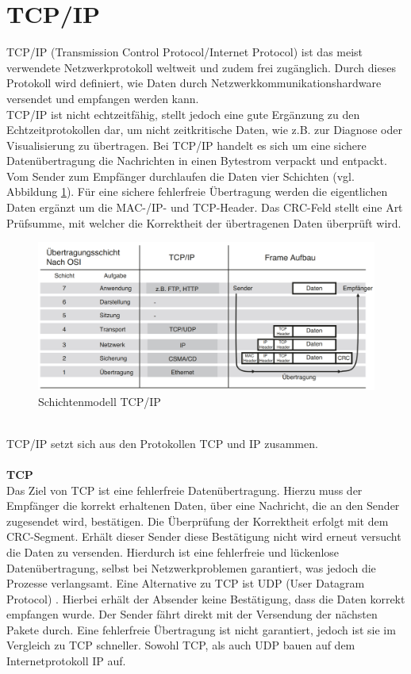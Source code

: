 \documentclass[ a4paper,
                oneside,
                toc=bibliography,
                toc=listof
                ]{scrbook}
\begin{document}
	\section{TCP/IP}
	TCP/IP (Transmission Control Protocol/Internet Protocol) ist das meist verwendete Netzwerkprotokoll weltweit und zudem frei zugänglich. Durch dieses Protokoll wird definiert, wie Daten durch Netzwerkkommunikationshardware versendet und empfangen werden kann. \cite{CS9_TCP} \\
	TCP/IP ist nicht echtzeitfähig, stellt jedoch eine gute Ergänzung zu den Echtzeitprotokollen dar, um nicht zeitkritische Daten, wie z.B. zur Diagnose oder  Visualisierung zu übertragen. Bei TCP/IP handelt es sich um eine sichere Datenübertragung die Nachrichten in einen Bytestrom verpackt und entpackt. Vom Sender zum Empfänger durchlaufen die Daten vier Schichten (vgl. Abbildung \ref{fig:Schichtenmodell}). Für eine sichere fehlerfreie Übertragung werden die eigentlichen Daten ergänzt um die MAC-/IP- und TCP-Header. Das CRC-Feld stellt eine Art Prüfsumme, mit welcher die Korrektheit der übertragenen Daten überprüft wird. \cite{hering2012elektrotechnik}
	\begin{figure}[!ht]
		\centering
		\includegraphics[width=1.0\linewidth]{./images/Schichtenmodell_TCP_IP.png}
		\caption{Schichtenmodell TCP/IP \cite{hering2012elektrotechnik}}
		\label{fig:Schichtenmodell}
	\end{figure} \\
	TCP/IP setzt sich aus den Protokollen TCP und IP zusammen.\\
	\\
	\textbf{TCP}\\
	Das Ziel von TCP ist eine fehlerfreie Datenübertragung. Hierzu muss der Empfänger die korrekt erhaltenen Daten, über eine Nachricht, die an den Sender zugesendet wird, bestätigen. Die Überprüfung der Korrektheit erfolgt mit dem CRC-Segment. Erhält dieser Sender diese Bestätigung nicht wird erneut versucht die Daten zu versenden. Hierdurch ist eine fehlerfreie und lückenlose Datenübertragung, selbst bei Netzwerkproblemen garantiert, was jedoch die Prozesse verlangsamt. Eine Alternative zu TCP ist UDP (User Datagram Protocol) . Hierbei erhält der Absender keine Bestätigung, dass die Daten korrekt empfangen wurde. Der Sender fährt direkt mit der Versendung der nächsten Pakete durch. Eine fehlerfreie Übertragung ist nicht garantiert, jedoch ist sie im Vergleich zu TCP schneller. Sowohl TCP, als auch UDP bauen auf dem Internetprotokoll IP auf. \cite{CS9_TCP}\\
\end{document}
